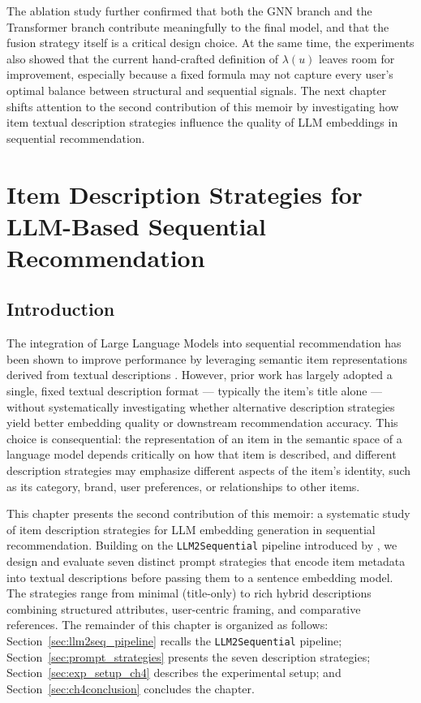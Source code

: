 \documentclass[12pt,a4paper]{report}
\begin{document}
The ablation study further confirmed that both the GNN branch and the
Transformer branch contribute meaningfully to the final model, and that the
fusion strategy itself is a critical design choice. At the same time, the
experiments also showed that the current hand-crafted definition of
\(\lambda(u)\) leaves room for improvement, especially because a fixed formula
may not capture every user's optimal balance between structural and sequential
signals. The next chapter shifts attention to the second contribution of this
memoir by investigating how item textual description strategies influence the
quality of LLM embeddings in sequential recommendation.


\chapter{Item Description Strategies for LLM-Based Sequential Recommendation}

\section{Introduction}

The integration of Large Language Models into sequential recommendation has
been shown to improve performance by leveraging semantic item representations
derived from textual descriptions \citep{boz2025}. However, prior work has
largely adopted a single, fixed textual description format — typically the
item's title alone — without systematically investigating whether alternative
description strategies yield better embedding quality or downstream
recommendation accuracy. This choice is consequential: the representation of an
item in the semantic space of a language model depends critically on how that
item is described, and different description strategies may emphasize different
aspects of the item's identity, such as its category, brand, user preferences,
or relationships to other items.

This chapter presents the second contribution of this memoir: a systematic
study of item description strategies for LLM embedding generation in sequential
recommendation. Building on the \texttt{LLM2Sequential} pipeline introduced by
\citet{boz2025}, we design and evaluate seven distinct prompt strategies that
encode item metadata into textual descriptions before passing them to a
sentence embedding model. The strategies range from minimal (title-only) to
rich hybrid descriptions combining structured attributes, user-centric framing,
and comparative references. The remainder of this chapter is organized as
follows: Section~\ref{sec:llm2seq_pipeline} recalls the
\texttt{LLM2Sequential} pipeline; Section~\ref{sec:prompt_strategies} presents
the seven description strategies; Section~\ref{sec:exp_setup_ch4} describes the
experimental setup; and Section~\ref{sec:ch4conclusion} concludes the chapter.
\end{document}
